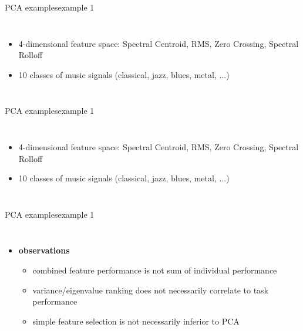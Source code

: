 \begin{frame}{PCA examples}{example 1}
    \begin{columns}
        \begin{itemize}
            \item 4-dimensional feature space: Spectral Centroid, RMS, Zero Crossing, Spectral Rolloff
            \item 10 classes of music signals (classical, jazz, blues, metal, ...)
        \end{itemize}
    \end{columns}
\end{frame}

\begin{frame}{PCA examples}{example 1}
    \begin{columns}
        \begin{itemize}
            \item 4-dimensional feature space: Spectral Centroid, RMS, Zero Crossing, Spectral Rolloff
            \item 10 classes of music signals (classical, jazz, blues, metal, ...)
        \end{itemize}
        \vspace{-5mm}
    \end{columns}
\end{frame}

\begin{frame}{PCA examples}{example 1}
    \begin{columns}
        
        \begin{itemize}
            \item \textbf{observations}
            \begin{itemize}
                \item   combined feature performance is not sum of individual performance
                \item   variance/eigenvalue ranking does not necessarily correlate to task performance
                \item   simple feature selection is not necessarily inferior to PCA
            \end{itemize}
        \end{itemize}
        \vspace{-5mm}
    \end{columns}
\end{frame}

